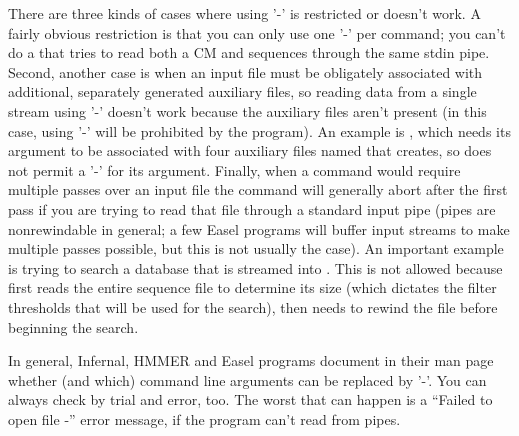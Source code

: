 There are three kinds of cases where using '-' is restricted or
doesn't work. A fairly obvious restriction is that you can only use
one '-' per command; you can't do a  that tries to
read both a CM and sequences through the same stdin
pipe. Second, another case is when an input file must be obligately
associated with additional, separately generated auxiliary files, so
reading data from a single stream using '-' doesn't work because the
auxiliary files aren't present (in this case, using '-' will be
prohibited by the program). An example is , which needs
its  argument to be associated with four auxiliary
files named  that  creates,
so  does not permit a '-' for its 
argument. Finally, when a command would require multiple passes over
an input file the command will generally abort after the first pass
if you are trying to read that file through a standard input pipe
(pipes are nonrewindable in general; a few Easel programs
will buffer input streams to make multiple passes possible, but this
is not usually the case). An important example is trying to search a
database that is streamed into . This is not allowed
because  first reads the entire sequence file to
determine its size (which dictates the filter thresholds that will be
used for the search), then needs to rewind the file before beginning
the search.

In general, Infernal, HMMER and Easel programs document in their man page
whether (and which) command line arguments can be replaced by '-'.
You can always check by trial and error, too. The worst that can
happen is a ``Failed to open file -'' error message, if the program
can't read from pipes.




